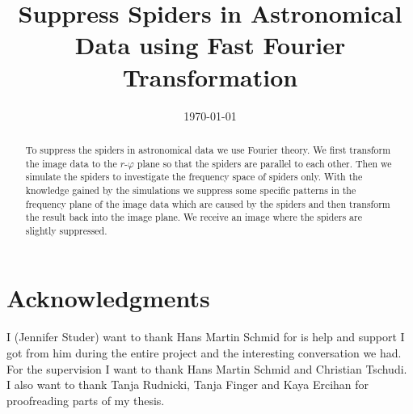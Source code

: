 \documentclass[a4paper,10pt,oneside, fleqn]{article}
\title{Suppress Spiders in Astronomical Data using Fast Fourier Transformation}
\date{\today}
\begin{document}
\maketitle

\pagestyle{fancy}               	%

\vspace*{\fill}
\begin{abstract}
To suppress the spiders in astronomical data we use Fourier theory. We first transform the image data to the $r$-$\varphi$ plane so that the spiders are parallel to each other. Then we simulate the spiders to investigate the frequency space of spiders only. With the knowledge gained by the simulations we suppress some specific patterns in the frequency plane of the image data which are caused by the spiders and then transform the result back into the image plane. We receive an image where the spiders are slightly suppressed. 
\end{abstract}
\vspace*{\fill}
\newpage

\tableofcontents
\newpage











\section{Acknowledgments}
I (Jennifer Studer) want to thank Hans Martin Schmid for is help and support I got from him during the entire project and the interesting conversation we had. For the supervision I want to thank Hans Martin Schmid and Christian Tschudi. I also want to thank Tanja Rudnicki, Tanja Finger and Kaya Ercihan for proofreading parts of my thesis. 

\newpage 

\appendix


\newpage


\end{document}
